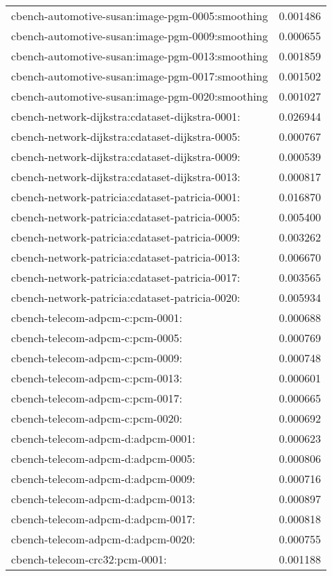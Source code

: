 \begin{longtable}{lr}
cbench-automotive-susan:image-pgm-0005:smoothing & 0.001486 \\
cbench-automotive-susan:image-pgm-0009:smoothing & 0.000655 \\
cbench-automotive-susan:image-pgm-0013:smoothing & 0.001859 \\
cbench-automotive-susan:image-pgm-0017:smoothing & 0.001502 \\
cbench-automotive-susan:image-pgm-0020:smoothing & 0.001027 \\
cbench-network-dijkstra:cdataset-dijkstra-0001: & 0.026944 \\
cbench-network-dijkstra:cdataset-dijkstra-0005: & 0.000767 \\
cbench-network-dijkstra:cdataset-dijkstra-0009: & 0.000539 \\
cbench-network-dijkstra:cdataset-dijkstra-0013: & 0.000817 \\
cbench-network-patricia:cdataset-patricia-0001: & 0.016870 \\
cbench-network-patricia:cdataset-patricia-0005: & 0.005400 \\
cbench-network-patricia:cdataset-patricia-0009: & 0.003262 \\
cbench-network-patricia:cdataset-patricia-0013: & 0.006670 \\
cbench-network-patricia:cdataset-patricia-0017: & 0.003565 \\
cbench-network-patricia:cdataset-patricia-0020: & 0.005934 \\
cbench-telecom-adpcm-c:pcm-0001: & 0.000688 \\
cbench-telecom-adpcm-c:pcm-0005: & 0.000769 \\
cbench-telecom-adpcm-c:pcm-0009: & 0.000748 \\
cbench-telecom-adpcm-c:pcm-0013: & 0.000601 \\
cbench-telecom-adpcm-c:pcm-0017: & 0.000665 \\
cbench-telecom-adpcm-c:pcm-0020: & 0.000692 \\
cbench-telecom-adpcm-d:adpcm-0001: & 0.000623 \\
cbench-telecom-adpcm-d:adpcm-0005: & 0.000806 \\
cbench-telecom-adpcm-d:adpcm-0009: & 0.000716 \\
cbench-telecom-adpcm-d:adpcm-0013: & 0.000897 \\
cbench-telecom-adpcm-d:adpcm-0017: & 0.000818 \\
cbench-telecom-adpcm-d:adpcm-0020: & 0.000755 \\
cbench-telecom-crc32:pcm-0001: & 0.001188 \\

\end{longtable}

